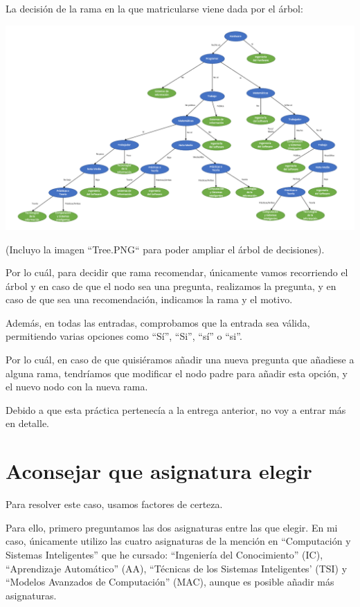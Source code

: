 \documentclass[11pt,a4paper]{article}
\begin{document}
La decisión de la rama en la que matricularse viene dada por el árbol:
\begin{center}
\includegraphics[scale=0.35]{./Tree.PNG}
\end{center}

(Incluyo la imagen ``Tree.PNG`` para poder ampliar el árbol de decisiones).

Por lo cuál, para decidir que rama recomendar, únicamente vamos recorriendo el árbol y en caso de que el nodo sea una pregunta, realizamos la pregunta, y en caso de que sea una recomendación, indicamos la rama y el motivo.

Además, en todas las entradas, comprobamos que la entrada sea válida, permitiendo varias opciones como ``Sí'', ``Si'', ``sí'' o ``si''.

Por lo cuál, en caso de que quisiéramos añadir una nueva pregunta que añadiese a alguna rama, tendríamos que modificar el nodo padre para añadir esta opción, y el nuevo nodo con la nueva rama.

Debido a que esta práctica pertenecía a la entrega anterior, no voy a entrar más en detalle.

\section{Aconsejar que asignatura elegir}

Para resolver este caso, usamos factores de certeza.

Para ello, primero preguntamos las dos asignaturas entre las que elegir. En mi caso, únicamente utilizo las cuatro asignaturas de la mención en ``Computación y Sistemas Inteligentes'' que he cursado: ``Ingeniería del Conocimiento'' (IC), ``Aprendizaje Automático'' (AA), ``Técnicas de los Sistemas Inteligentes' (TSI) y ``Modelos Avanzados de Computación'' (MAC), aunque es posible añadir más asignaturas.
\end{document}
